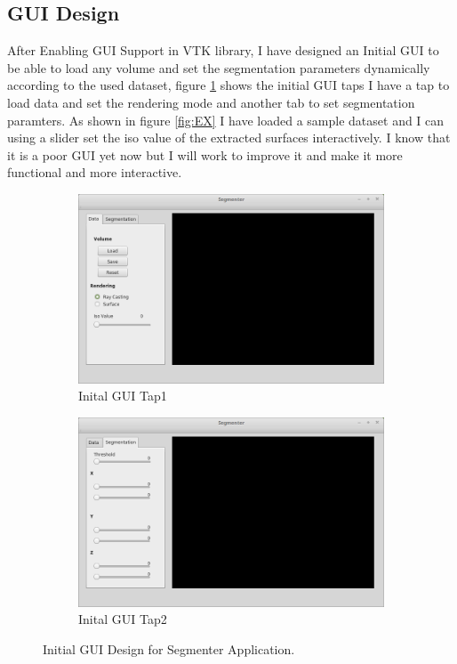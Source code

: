 \documentclass[12pt, b5paper]{article}
\begin{document}
\subsection{GUI Design}
After Enabling GUI Support in VTK library, I have designed an Initial GUI to be able to load any volume and set the segmentation parameters dynamically according to the used dataset, figure \ref{fig:GUI} shows the initial GUI taps I have a tap to load data and set the rendering mode and another tab to set segmentation paramters. As shown in figure \ref{fig:EX} I have loaded a sample dataset and I can using a slider set the iso value of the extracted surfaces interactively. I know that it is a poor GUI yet now but I will work to improve it and make it more functional and more interactive.
\begin{figure}
    \centering
    \begin{subfigure}[b]{0.65\textwidth}
        \centering
        \includegraphics[width=\textwidth]{T1}
        \caption{Inital GUI Tap1}
    \end{subfigure}
    \hfill
    \begin{subfigure}[b]{0.65\textwidth}
        \centering
        \includegraphics[width=\textwidth]{T2}
        \caption{Inital GUI Tap2}
    \end{subfigure}
    \caption{Initial GUI Design for Segmenter Application.}
    \label{fig:GUI}
\end{figure}
\end{document}
